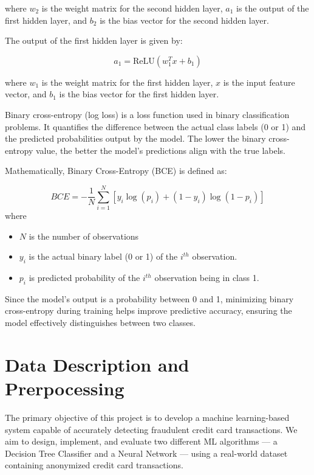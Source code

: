\documentclass[11pt]{article}
\begin{document}
where $w_2$ is the weight matrix for the second hidden layer, $a_1$ is the output of the first hidden layer, and $b_2$ is the bias vector for the second hidden layer. 

The output of the first hidden layer is given by:

\begin{equation}
	a_1 = \text{ReLU}(w^T_1 x + b_1)
\end{equation}

where $w_1$ is the weight matrix for the first hidden layer, $x$ is the input feature vector, and $b_1$ is the bias vector for the first hidden layer.
 
Binary cross-entropy (log loss) is a loss function used in binary classification problems. It quantifies the difference between the actual class labels (0 or 1) and the predicted probabilities output by the model. The lower the binary cross-entropy value, the better the model’s predictions align with the true labels.

Mathematically, Binary Cross-Entropy (BCE) is defined as:

\begin{equation}
	BCE = - \frac{1}{N}\sum_{i=1}^{N}[y_i \log(p_i) + (1- y_i)\log(1-p_i)]	 
\end{equation}	
where
\begin{itemize}
	\item $N$ is the number of observations
	\item $y_i$ is the actual binary label (0 or 1) of the $i^{th}$ observation.
    \item $p_i$ is predicted probability of the $i^{th}$ observation being in class 1.	 
\end{itemize}

Since the model’s output is a probability between 0 and 1, minimizing binary cross-entropy during training helps improve predictive accuracy, ensuring the model effectively distinguishes between two classes.

\section{Data Description and Prerpocessing}
The primary objective of this project is to develop a machine learning-based system capable of accurately detecting fraudulent credit card transactions. We aim to design, implement, and evaluate two different ML algorithms — a Decision Tree Classifier and a Neural Network — using a real-world dataset containing anonymized credit card transactions.
\end{document}
